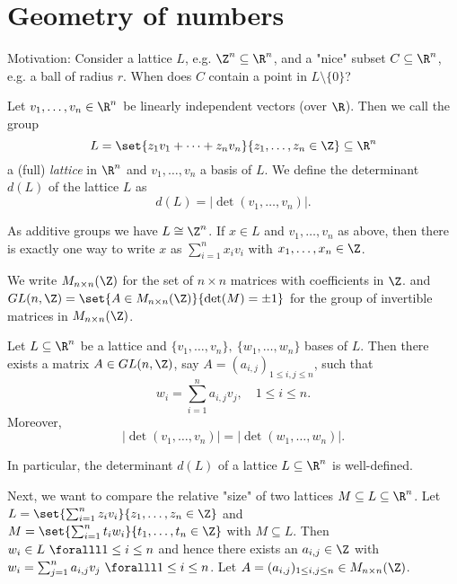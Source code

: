 \section{Geometry of numbers}

Motivation: Consider a lattice \( L \), e.g. \( \Z^n \subseteq \R^n \), and a "nice" subset \( C \subseteq \R^n \), e.g. a ball of radius \( r \).
When does \( C \) contain a point in \( L \setminus\{0\} \)?

\begin{defn*}[Lattice]
	Let \( v_1, \dotsc, v_n \in \R^n \) be linearly independent vectors (over \( \R \)).
	Then we call the group
	\[ L = \set{z_1 v_1 + \dots + z_n v_n}{z_1, \dotsc, z_n \in \Z} \subseteq \R^n \]
	a (full) \emph{lattice} in \( \R^n \) and \( v_1, \dotsc, v_n \) a basis of \( L \).
	We define the determinant \( d(L) \) of the lattice \( L \) as
	\[ d(L) = |\det(v_1, \dotsc, v_n)|. \]
\end{defn*}

\begin{rem*}
	As additive groups we have \( L \cong \Z^n \).
	If \( x \in L \) and \( v_1, \dotsc, v_n \) as above, then there is exactly one way to write \( x \) as \( \sum_{i=1}^{n} x_i v_i \) with \( x_1, \dotsc, x_n \in \Z \).
\end{rem*}

\begin{notat*}
	We write \( M_{n \times n}(\Z) \) for the set of \( n \times n \) matrices with coefficients in \( \Z \). and \( GL(n, \Z) = \set{A \in M_{n \times n}(\Z)}{\det(M) = \pm 1} \) for the group of invertible matrices in \( M_{n \times n}(\Z) \).
\end{notat*}

\begin{lem}
	Let \( L \subseteq \R^n \) be a lattice and \( \{v_1, \dotsc, v_n\},\ \{w_1, \dotsc, w_n\} \) bases of \( L \).
	Then there exists a matrix \( A \in GL(n, \Z) \), say \( A = (a_{i,j})_{1 \leq i,j \leq n} \), such that
	\[ w_i = \sum_{i=1}^{n} a_{i,j}v_j,\quad 1 \leq i \leq n. \]
	Moreover,
	\[ |\det (v_1, \dotsc, v_n)| = |\det(w_1, \dotsc, w_n)|. \]
\end{lem}

\begin{rem*}
	In particular, the determinant \( d(L) \) of a lattice \( L \subseteq \R^n \) is well-defined.
\end{rem*}

Next, we want to compare the relative "size" of two lattices \( M \subseteq L \subseteq \R^n \).
Let \( L = \set{\sum_{i=1}^{n} z_i v_i}{z_1, \dotsc, z_n \in \Z} \) and \( M = \set{\sum_{i=1}^{n} t_i w_i}{t_1, \dotsc, t_n \in \Z} \) with \( M \subseteq L \).
Then \( w_i \in L\ \foralll 1 \leq i \leq n \) and hence there exists an \( a_{i,j} \in \Z \) with \( w_i = \sum_{j=1}^{n} a_{i,j} v_j\ \foralll 1 \leq i \leq n \).
Let \( A = (a_{i,j})_{1 \leq i,j \leq n} \in M_{n \times n}(\Z) \).

